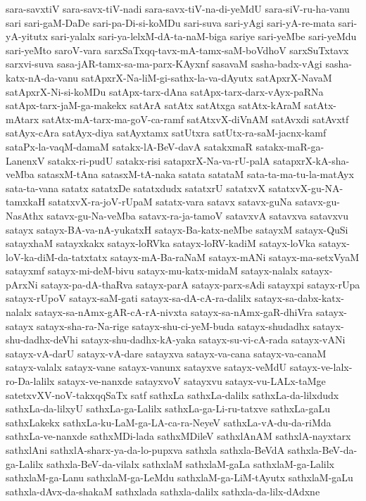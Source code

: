 {sara-savxtiV
sara-savx-tiV-nadi
sara-savx-tiV-na-di-yeMdU
sara-siV-ru-ha-vanu
sari
sari-gaM-DaDe
sari-pa-Di-si-koMDu
sari-suva
sari-yAgi
sari-yA-re-mata
sari-yA-yitutx
sari-yalalx
sari-ya-lelxM-dA-ta-naM-biga
sariye
sari-yeMbe
sari-yeMdu
sari-yeMto
saroV-vara
sarxSaTxqq-tavx-mA-tamx-saM-boVdhoV
sarxSuTxtavx
sarxvi-suva
sasa-jAR-tamx-sa-ma-parx-KAyxnf
sasavaM
sasha-badx-vAgi
sasha-katx-nA-da-vanu
satApxrX-Na-liM-gi-sathx-la-va-dAyutx
satApxrX-NavaM
satApxrX-Ni-si-koMDu
satApx-tarx-dAna
satApx-tarx-darx-vAyx-paRNa
satApx-tarx-jaM-ga-makekx
satArA
satAtx
satAtxga
satAtx-kAraM
satAtx-mAtarx
satAtx-mA-tarx-ma-goV-ca-ramf
satAtxvX-diVnAM
satAvxdi
satAvxtf
satAyx-cAra
satAyx-diya
satAyxtamx
satUtxra
satUtx-ra-saM-jacnx-kamf
sataPx-la-vaqM-damaM
satakx-lA-BeV-davA
satakxmaR
satakx-maR-ga-LanenxV
satakx-ri-pudU
satakx-risi
satapxrX-Na-va-rU-palA
satapxrX-kA-sha-veMba
satasxM-tAna
satasxM-tA-naka
satata
satataM
sata-ta-ma-tu-la-matAyx
sata-ta-vana
satatx
satatxDe
satatxdudx
satatxrU
satatxvX
satatxvX-gu-NA-tamxkaH
satatxvX-ra-joV-rUpaM
satatx-vara
satavx
satavx-guNa
satavx-gu-NasAthx
satavx-gu-Na-veMba
satavx-ra-ja-tamoV
satavxvA
satavxva
satavxvu
satayx
satayx-BA-va-nA-yukatxH
satayx-Ba-katx-neMbe
satayxM
satayx-QuSi
satayxhaM
satayxkakx
satayx-loRVka
satayx-loRV-kadiM
satayx-loVka
satayx-loV-ka-diM-da-tatxtatx
satayx-mA-Ba-raNaM
satayx-mANi
satayx-ma-setxVyaM
satayxmf
satayx-mi-deM-bivu
satayx-mu-katx-midaM
satayx-nalalx
satayx-pArxNi
satayx-pa-dA-thaRva
satayx-parA
satayx-parx-sAdi
satayxpi
satayx-rUpa
satayx-rUpoV
satayx-saM-gati
satayx-sa-dA-cA-ra-dalilx
satayx-sa-dabx-katx-nalalx
satayx-sa-nAmx-gAR-cA-rA-nivxta
satayx-sa-nAmx-gaR-dhiVra
satayx-satayx
satayx-sha-ra-Na-rige
satayx-shu-ci-yeM-buda
satayx-shudadhx
satayx-shu-dadhx-deVhi
satayx-shu-dadhx-kA-yaka
satayx-su-vi-cA-rada
satayx-vANi
satayx-vA-darU
satayx-vA-dare
satayxva
satayx-va-cana
satayx-va-canaM
satayx-valalx
satayx-vane
satayx-vanunx
satayxve
satayx-veMdU
satayx-ve-lalx-ro-Da-lalilx
satayx-ve-nanxde
satayxvoV
satayxvu
satayx-vu-LALx-taMge
satetxvXV-noV-takxqqSaTx
satf
sathxLa
sathxLa-dalilx
sathxLa-da-lilxdudx
sathxLa-da-lilxyU
sathxLa-ga-Lalilx
sathxLa-ga-Li-ru-tatxve
sathxLa-gaLu
sathxLakekx
sathxLa-ku-LaM-ga-LA-ca-ra-NeyeV
sathxLa-vA-du-da-riMda
sathxLa-ve-nanxde
sathxMDi-lada
sathxMDileV
sathxlAnAM
sathxlA-nayxtarx
sathxlAni
sathxlA-sharx-ya-da-lo-pupxva
sathxla
sathxla-BeVdA
sathxla-BeV-da-ga-Lalilx
sathxla-BeV-da-vilalx
sathxlaM
sathxlaM-gaLa
sathxlaM-ga-Lalilx
sathxlaM-ga-Lanu
sathxlaM-ga-LeMdu
sathxlaM-ga-LiM-tAyutx
sathxlaM-gaLu
sathxla-dAvx-da-shakaM
sathxlada
sathxla-dalilx
sathxla-da-lilx-dAdxne
}
